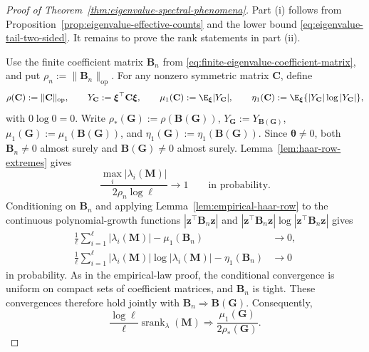 \documentclass{article}
\newcommand{\srank}{\operatorname{srank}}
\newcommand{\op}{\operatorname{op}}
\newcommand{\weak}{\Rightarrow}
\newcommand{\bB}{\mathbf{B}}
\newcommand{\bC}{\mathbf{C}}
\newcommand{\bM}{\mathbf{M}}
\newcommand{\bG}{\mathbf{G}}
\theoremstyle{definition}
\theoremstyle{remark}
\begin{document}
\begin{proof}[Proof of Theorem~\ref{thm:eigenvalue-spectral-phenomena}]
Part (i) follows from Proposition~\ref{prop:eigenvalue-effective-counts} and the
lower bound \eqref{eq:eigenvalue-tail-two-sided}.  It remains to prove the rank
statements in part (ii).

Use the finite coefficient matrix $\bB_n$ from
\eqref{eq:finite-eigenvalue-coefficient-matrix}, and put
$\rho_n:=\|\bB_n\|_{\op}$.  For any nonzero symmetric matrix $\bC$, define
\[
    \rho(\bC):=\|\bC\|_{\op},
    \qquad
    Y_{\bC}:=\boldsymbol{\xi}^\top\bC\boldsymbol{\xi},
    \qquad
    \mu_1(\bC):=\E_{\boldsymbol{\xi}}|Y_{\bC}|,
    \qquad
    \eta_1(\bC):=
    \E_{\boldsymbol{\xi}}\{|Y_{\bC}|\log|Y_{\bC}|\},
\]
with $0\log0=0$.  Write $\rho_*(\bG):=\rho(\bB(\bG))$,
$Y_{\bG}:=Y_{\bB(\bG)}$, $\mu_1(\bG):=\mu_1(\bB(\bG))$, and
$\eta_1(\bG):=\eta_1(\bB(\bG))$.  Since
$\boldsymbol{\theta}\neq0$, both $\bB_n\neq0$ almost surely and
$\bB(\bG)\neq0$ almost surely.  Lemma~\ref{lem:haar-row-extremes} gives
\[
    \frac{\max_i|\lambda_i(\bM)|}{2\rho_n\log\ell}
    \longrightarrow 1
    \qquad\text{in probability.}
\]
Conditioning on $\bB_n$ and applying
Lemma~\ref{lem:empirical-haar-row} to the continuous polynomial-growth
functions $|\mathbf z^\top\bB_n\mathbf z|$ and
$|\mathbf z^\top\bB_n\mathbf z|\log|\mathbf z^\top\bB_n\mathbf z|$ gives
\begin{align}
    \frac{1}{\ell}\sum_{i=1}^{\ell}|\lambda_i(\bM)|
    -\mu_1(\bB_n)&\longrightarrow0,
    \label{eq:finite-eigenvalue-first-moment}\\
    \frac{1}{\ell}\sum_{i=1}^{\ell}
    |\lambda_i(\bM)|\log|\lambda_i(\bM)|
    -\eta_1(\bB_n)&\longrightarrow0
    \label{eq:finite-eigenvalue-log-moment}
\end{align}
in probability.  As in the empirical-law proof, the conditional convergence is
uniform on compact sets of coefficient matrices, and $\bB_n$ is tight.  These
convergences therefore hold jointly with
$\bB_n\weak\bB(\bG)$.  Consequently,
\begin{equation}
    \frac{\log\ell}{\ell}\srank_{\lambda}(\bM)
    \weak
    \frac{\mu_1(\bG)}{2\rho_*(\bG)}.
    \label{eq:eigenvalue-stable-rank-prefactor}
\end{equation}


\end{proof}
\end{document}

